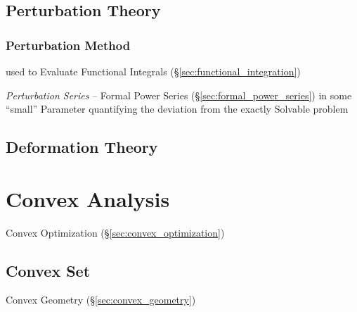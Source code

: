 \subsection{Perturbation Theory}\label{sec:perturbation_theory}

\subsubsection{Perturbation Method}\label{sec:perturbation_method}

used to Evaluate Functional Integrals (\S\ref{sec:functional_integration})

\emph{Perturbation Series} -- Formal Power Series
(\S\ref{sec:formal_power_series}) in some ``small'' Parameter quantifying the
deviation from the exactly Solvable problem



\subsection{Deformation Theory}\label{sec:deformation_theory}




\section{Convex Analysis}\label{sec:convex_analysis}

\fist Convex Optimization (\S\ref{sec:convex_optimization})



\subsection{Convex Set}\label{sec:convex_set}


\fist Convex Geometry (\S\ref{sec:convex_geometry})


